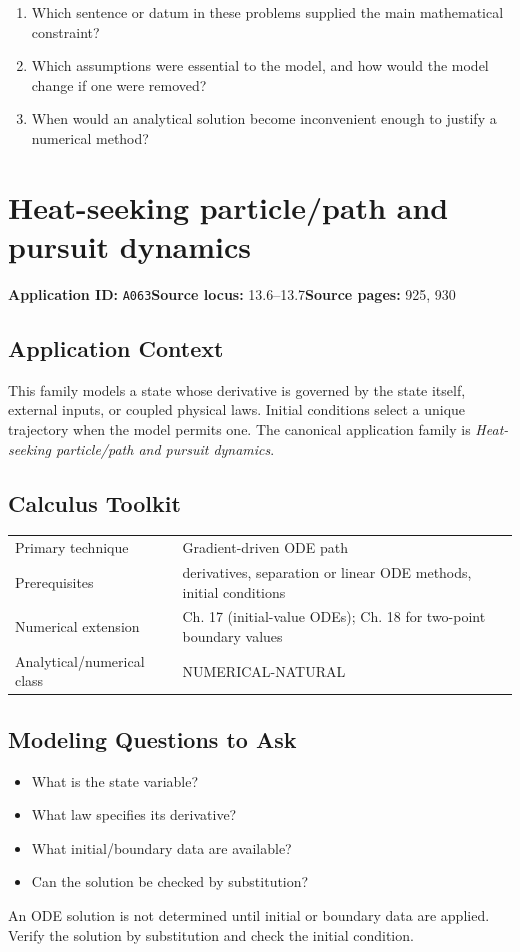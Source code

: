 \documentclass[11pt]{book}
\newcommand{\pid}[1]{\texttt{#1}}
\begin{document}
\begin{reflectionbox}\begin{enumerate}
\item Which sentence or datum in these problems supplied the main mathematical constraint?
\item Which assumptions were essential to the model, and how would the model change if one were removed?
\item When would an analytical solution become inconvenient enough to justify a numerical method?
\end{enumerate}\end{reflectionbox}
\chapter{Heat-seeking particle/path and pursuit dynamics}\label{app:A063}
\textbf{Application ID:} \pid{A063}\quad \textbf{Source locus:} 13.6–13.7\quad \textbf{Source pages:} 925, 930
\section*{Application Context}
This family models a state whose derivative is governed by the state itself, external inputs, or coupled physical laws. Initial conditions select a unique trajectory when the model permits one. The canonical application family is \emph{Heat-seeking particle/path and pursuit dynamics}.
\section*{Calculus Toolkit}
\begin{tabularx}{\textwidth}{@{}lX@{}}\toprule
Primary technique & Gradient-driven ODE path \\
Prerequisites & derivatives, separation or linear ODE methods, initial conditions \\
Numerical extension & Ch. 17 (initial-value ODEs); Ch. 18 for two-point boundary values \\
Analytical/numerical class & NUMERICAL-NATURAL \\
\bottomrule\end{tabularx}
\section*{Modeling Questions to Ask}\begin{itemize}
\item What is the state variable?
\item What law specifies its derivative?
\item What initial/boundary data are available?
\item Can the solution be checked by substitution?
\end{itemize}
\begin{errorbox}An ODE solution is not determined until initial or boundary data are applied. Verify the solution by substitution and check the initial condition.\end{errorbox}
\end{document}
